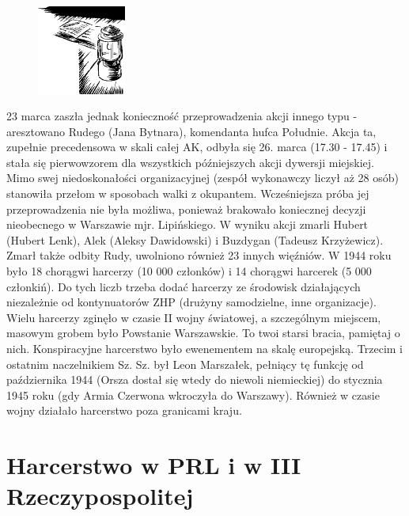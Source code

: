 \begin{figure}
  \begin{center}
    \includegraphics[width=2.9cm]{grafiki/rudy.png}
  \end{center}
\end{figure}
23 marca zaszła jednak konieczność przeprowadzenia akcji innego typu - aresztowano Rudego (Jana Bytnara), komendanta hufca Południe. Akcja ta, zupełnie precedensowa w skali całej AK, odbyła się 26. marca (17.30 - 17.45) i stała się pierwowzorem dla wszystkich późniejszych akcji dywersji miejskiej. Mimo swej niedoskonałości organizacyjnej (zespół wykonawczy liczył aż 28 osób) stanowiła przełom w sposobach walki z okupantem. Wcześniejsza próba jej przeprowadzenia nie była możliwa, ponieważ brakowało koniecznej decyzji nieobecnego w Warszawie mjr. Lipińskiego. W wyniku akcji zmarli Hubert (Hubert Lenk), Alek (Aleksy Dawidowski) i Buzdygan (Tadeusz Krzyżewicz). Zmarł także odbity Rudy, uwolniono również 23 innych więźniów. W 1944 roku było 18 chorągwi harcerzy (10 000 członków) i 14 chorągwi harcerek (5 000 członkiń). Do tych liczb trzeba dodać harcerzy ze środowisk działających niezależnie od kontynuatorów ZHP (drużyny samodzielne, inne organizacje). Wielu harcerzy zginęło w czasie II wojny światowej, a szczególnym miejscem, masowym grobem było Powstanie Warszawskie. To twoi starsi bracia, pamiętaj o nich. Konspiracyjne harcerstwo było ewenementem na skalę europejską. Trzecim i ostatnim naczelnikiem Sz. Sz. był Leon Marszałek, pełniący tę funkcję od października 1944 (Orsza dostał się wtedy do niewoli niemieckiej) do stycznia 1945 roku (gdy Armia Czerwona wkroczyła do Warszawy). Również w czasie wojny działało harcerstwo poza granicami kraju.

\section{Harcerstwo w PRL i w III Rzeczypospolitej}

